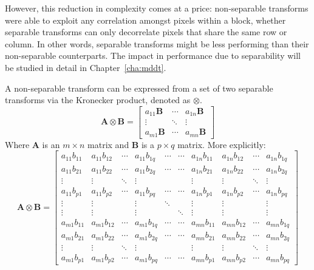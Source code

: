\documentclass[11pt,a4paper,openright,twoside]{book}
\numberwithin{equation}{section} %
\numberwithin{figure}{section} %
\numberwithin{table}{section} %
\begin{document}
However, this reduction in complexity comes at a price: non-separable
transforms were able to exploit any correlation amongst pixels within a
block, whether separable transforms can only decorrelate pixels that
share the same row or column.
In other words, separable transforms might be less performing than their
non-separable counterparts.
The impact in performance due to separability will be studied in detail
in Chapter~\ref{cha:mddt}.

A non-separable transform can be expressed from a set of two separable
transforms via the Kronecker product, denoted as $\otimes$.
\begin{equation}
	\mathbf{A}\otimes\mathbf{B} = 
	\begin{bmatrix}
		a_{11} \mathbf{B} & \cdots & a_{1n}\mathbf{B} \\
		\vdots & \ddots & \vdots \\
		a_{m1} \mathbf{B} & \cdots & a_{mn} \mathbf{B}
	\end{bmatrix}
\end{equation}
Where $\mathbf{A}$ is an $m \times n$ matrix and $\mathbf{B}$ is a $p \times
q$ matrix.
More explicitly:
\begin{equation}
	\mathbf{A}\otimes\mathbf{B} =
	\begin{bmatrix}
		a_{11} b_{11} & a_{11} b_{12} & \cdots & a_{11} b_{1q} & \cdots & \cdots & a_{1n} b_{11} & a_{1n} b_{12} & \cdots & a_{1n} b_{1q} \\
		a_{11} b_{21} & a_{11} b_{22} & \cdots & a_{11} b_{2q} & \cdots & \cdots & a_{1n} b_{21} & a_{1n} b_{22} & \cdots & a_{1n} b_{2q} \\
		\vdots & \vdots & \ddots & \vdots & & & \vdots & \vdots & \ddots & \vdots \\
		a_{11} b_{p1} & a_{11} b_{p2} & \cdots & a_{11} b_{pq} & \cdots & \cdots & a_{1n} b_{p1} & a_{1n} b_{p2} & \cdots & a_{1n} b_{pq} \\
		\vdots & \vdots & & \vdots & \ddots & & \vdots & \vdots & & \vdots \\
		\vdots & \vdots & & \vdots & & \ddots & \vdots & \vdots & & \vdots \\
		a_{m1} b_{11} & a_{m1} b_{12} & \cdots & a_{m1} b_{1q} & \cdots & \cdots & a_{mn} b_{11} & a_{mn} b_{12} & \cdots & a_{mn} b_{1q} \\
		a_{m1} b_{21} & a_{m1} b_{22} & \cdots & a_{m1} b_{2q} & \cdots & \cdots & a_{mn} b_{21} & a_{mn} b_{22} & \cdots & a_{mn} b_{2q} \\
		\vdots & \vdots & \ddots & \vdots & & & \vdots & \vdots & \ddots & \vdots \\
		a_{m1} b_{p1} & a_{m1} b_{p2} & \cdots & a_{m1} b_{pq} & \cdots & \cdots & a_{mn} b_{p1} & a_{mn} b_{p2} & \cdots & a_{mn} b_{pq} 
	\end{bmatrix}
\end{equation}
\end{document}
